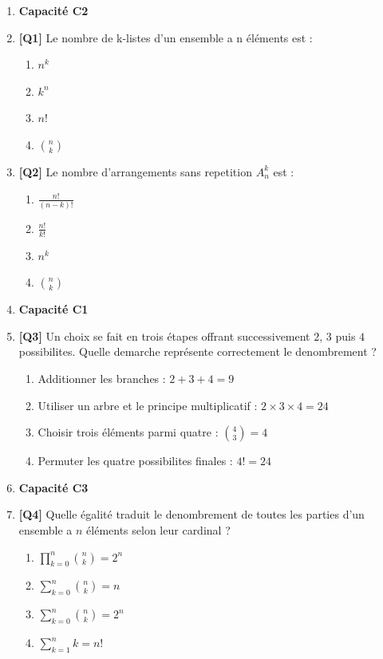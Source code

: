 \begin{enumerate}

\item[] \textbf{Capacité C2}

\item \textbf{[Q1]} Le nombre de k-listes d'un ensemble a n éléments est :
  \begin{enumerate}[label=\Alph*.]
    \item $n^k$
    \item $k^n$
    \item $n!$
    \item $\binom{n}{k}$
  \end{enumerate}

\item \textbf{[Q2]} Le nombre d'arrangements sans repetition $A_n^k$ est :
  \begin{enumerate}[label=\Alph*.]
    \item $\frac{n!}{(n-k)!}$
    \item $\frac{n!}{k!}$
    \item $n^k$
    \item $\binom{n}{k}$
  \end{enumerate}

\item[] \textbf{Capacité C1}

\item \textbf{[Q3]} Un choix se fait en trois étapes offrant successivement $2$, $3$ puis $4$ possibilites. Quelle demarche représente correctement le denombrement ?
  \begin{enumerate}[label=\Alph*.]
    \item Additionner les branches : $2+3+4=9$
    \item Utiliser un arbre et le principe multiplicatif : $2\times3\times4=24$
    \item Choisir trois éléments parmi quatre : $\binom{4}{3}=4$
    \item Permuter les quatre possibilites finales : $4!=24$
  \end{enumerate}

\item[] \textbf{Capacité C3}

\item \textbf{[Q4]} Quelle égalité traduit le denombrement de toutes les parties d'un ensemble a $n$ éléments selon leur cardinal ?
  \begin{enumerate}[label=\Alph*.]
    \item $\displaystyle\prod_{k=0}^{n} \binom{n}{k}=2^n$
    \item $\displaystyle\sum_{k=0}^{n} \binom{n}{k}=n$
    \item $\displaystyle\sum_{k=0}^{n} \binom{n}{k}=2^n$
    \item $\displaystyle\sum_{k=1}^{n} k=n!$
  \end{enumerate}


\end{enumerate}

